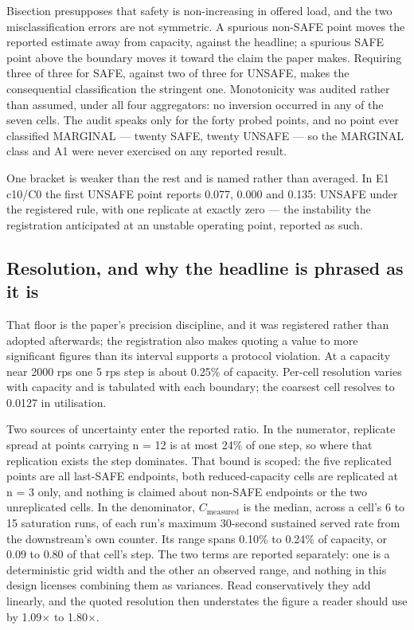 \documentclass{ieeeaccess}
\begin{document}
Bisection presupposes that safety is non-increasing in offered load, and the two misclassification errors are not symmetric. A spurious non-SAFE point moves the reported estimate away from capacity, against the headline; a spurious SAFE point above the boundary moves it toward the claim the paper makes. Requiring three of three for SAFE, against two of three for UNSAFE, makes the consequential classification the stringent one. Monotonicity was audited rather than assumed, under all four aggregators: no inversion occurred in any of the seven cells. The audit speaks only for the forty probed points, and no point ever classified MARGINAL --- twenty SAFE, twenty UNSAFE --- so the MARGINAL class and A1 were never exercised on any reported result.

One bracket is weaker than the rest and is named rather than averaged. In E1 c10/C0 the first UNSAFE point reports 0.077, 0.000 and 0.135: UNSAFE under the registered rule, with one replicate at exactly zero --- the instability the registration anticipated at an unstable operating point, reported as such.

\subsection{Resolution, and why the headline is phrased as it is}

That floor is the paper's precision discipline, and it was registered rather than adopted afterwards; the registration also makes quoting a value to more significant figures than its interval supports a protocol violation. At a capacity near 2000 rps one 5 rps step is about 0.25\% of capacity. Per-cell resolution varies with capacity and is tabulated with each boundary; the coarsest cell resolves to 0.0127 in utilisation.

Two sources of uncertainty enter the reported ratio. In the numerator, replicate spread at points carrying n = 12 is at most 24\% of one step, so where that replication exists the step dominates. That bound is scoped: the five replicated points are all last-SAFE endpoints, both reduced-capacity cells are replicated at n = 3 only, and nothing is claimed about non-SAFE endpoints or the two unreplicated cells. In the denominator, $C_{\mathrm{measured}}$ is the median, across a cell's 6 to 15 saturation runs, of each run's maximum 30-second sustained served rate from the downstream's own counter. Its range spans 0.10\% to 0.24\% of capacity, or 0.09 to 0.80 of that cell's step. The two terms are reported separately: one is a deterministic grid width and the other an observed range, and nothing in this design licenses combining them as variances. Read conservatively they add linearly, and the quoted resolution then understates the figure a reader should use by 1.09$\times$ to 1.80$\times$.
\end{document}
